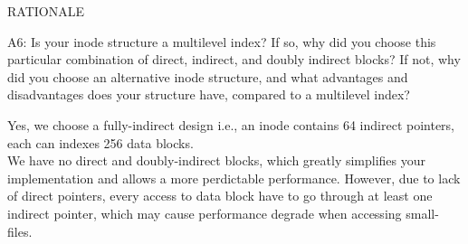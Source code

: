 \begin{aspect}{RATIONALE}
	\begin{qc}
		A6: Is your inode structure a multilevel index?  If so, why did you
		choose this particular combination of direct, indirect, and doubly
		indirect blocks?  If not, why did you choose an alternative inode
		structure, and what advantages and disadvantages does your
		structure have, compared to a multilevel index?
	\end{qc}
	Yes, we choose a fully-indirect design i.e., an inode contains 64 indirect pointers, each can indexes 256 data blocks.\\
	We have no direct and doubly-indirect blocks, which greatly simplifies your implementation and allows a more perdictable performance.
	However, due to lack of direct pointers, every access to data block have to go through at least one indirect pointer,
	which may cause performance degrade when accessing small-files.
\end{aspect}
